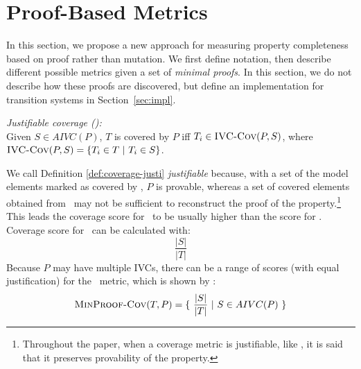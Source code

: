 \newcommand{\minproofcov}{\text{\sc MinProof-Cov}}


\section{Proof-Based Metrics}
\label{sec:method}

In this section, we propose a new approach for measuring property completeness based on proof rather than mutation.  We first define notation, then describe different possible metrics given a set of {\em minimal proofs}.  In this section, we do not describe how these proofs are discovered, but define an implementation for transition systems in Section~\ref{sec:impl}.

\begin{definition} {\emph{Justifiable coverage (\ivccov):}} \\
\label{def:coverage-justi}
Given $S \in AIVC(P)$, $T$ is covered by $P$ iff $T_i \in \text{\sc IVC-Cov} (P, S)$, where
$\text{\sc IVC-Cov} (P, S) = \{ T_i \in T ~|~ T_i \in S \}$.
\end{definition}
\vspace{2mm}

%
We call Definition \ref{def:coverage-justi} \emph{justifiable} because, with a set of the model elements marked as covered by \ivccov, $P$ is provable, whereas a set of covered elements obtained from \nondetcov\ may not be sufficient to reconstruct the proof of the property.\footnote{Throughout the paper, when a coverage metric is justifiable, like \ivccov, it is said that it preserves provability of the property.}
This leads the coverage score for \ivccov\ to be usually higher than the score for \nondetcov. Coverage score for \ivccov\ can be calculated with: $$\frac{|S|}{|T|}$$
Because $P$ may have multiple IVCs, there can be a range of scores (with equal justification) for the \ivccov\ metric, which is shown by \minproofcov:
\[
   \minproofcov(T, P) = \{~\frac{ |S|}{|T|}~|~S \in AIVC(P)~\}
\]

